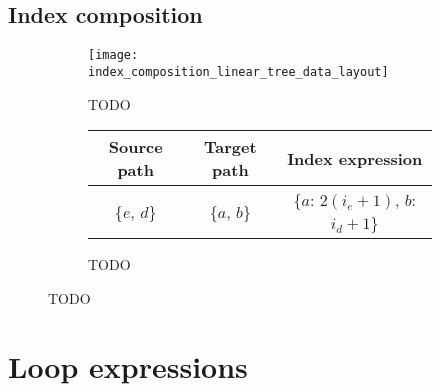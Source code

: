 \documentclass[thesis]{subfiles}
\begin{document}
\subsection{Index composition}
\label{sec:index_composition}

\begin{figure}
  \centering
  \begin{subfigure}{\textwidth}
    \centering
    \texttt{[image: index\_composition\_linear\_tree\_data\_layout]}
    \caption{TODO}
    \label{fig:index_composition_linear_tree_data_layout}
  \end{subfigure}

  \vspace{1em}

  \begin{subfigure}{\textwidth}
    \centering
    \begin{tabular}{|c|c|c|}
      \hline
      \textbf{Source path} & \textbf{Target path} & \textbf{Index expression} \\
      \hline
      \{$e$, $d$\} & \{$a$, $b$\} & \{$a$: $2 (i_e+1)$, $b$: $i_d+1$\} \\
      \hline
    \end{tabular}
    \caption{TODO}
    \label{fig:index_composition_linear_tree_exprs}
  \end{subfigure}

  \caption{TODO}
  \label{fig:index_composition_linear_tree_all}
\end{figure}

\section{Loop expressions}
\end{document}
